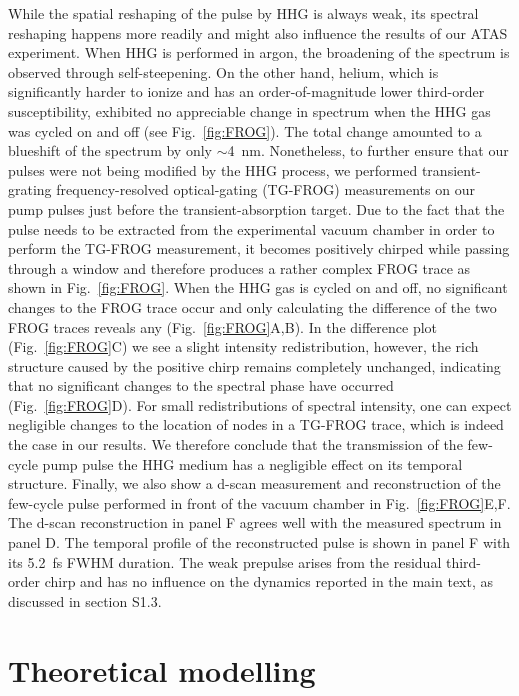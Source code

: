 \documentclass[12pt]{article}
\begin{document}
While the spatial reshaping of the pulse by HHG is always weak, its spectral reshaping happens more readily and might also influence the results of our ATAS experiment. When HHG is performed in argon, the broadening of the spectrum is observed through self-steepening. On the other hand, helium, which is significantly harder to ionize and has an order-of-magnitude lower third-order susceptibility, exhibited no appreciable change in spectrum when the HHG gas was cycled on and off (see Fig.~\ref{fig:FROG}). The total change amounted to a blueshift of the spectrum by only $\sim$4~nm. Nonetheless, to further ensure that our pulses were not being modified by the HHG process, we performed transient-grating frequency-resolved optical-gating (TG-FROG) measurements on our pump pulses just before the transient-absorption target. Due to the fact that the pulse needs to be extracted from the experimental vacuum chamber in order to perform the TG-FROG measurement, it becomes positively chirped while passing through a window and therefore produces a rather complex FROG trace as shown in Fig.~\ref{fig:FROG}. When the HHG gas is cycled on and off, no significant changes to the FROG trace occur and only calculating the difference of the two FROG traces reveals any (Fig.~\ref{fig:FROG}A,B). In the difference plot (Fig.~\ref{fig:FROG}C) we see a slight intensity redistribution, however, the rich structure caused by the positive chirp remains completely unchanged, indicating that no significant changes to the spectral phase have occurred (Fig.~\ref{fig:FROG}D). For small redistributions of spectral intensity, one can expect negligible changes to the location of nodes in a TG-FROG trace, which is indeed the case in our results. We therefore conclude that the transmission of the few-cycle pump pulse the HHG medium has a negligible effect on its temporal structure. Finally, we also show a d-scan measurement and reconstruction of the few-cycle pulse performed in front of the vacuum chamber in Fig.~\ref{fig:FROG}E,F. The d-scan reconstruction in panel F agrees well with the measured spectrum in panel D. The temporal profile of the reconstructed pulse is shown in panel F with its 5.2~fs FWHM duration. The weak prepulse arises from the residual third-order chirp and has no influence on the dynamics reported in the main text, as discussed in section S1.3.

\section{Theoretical modelling}
\end{document}
